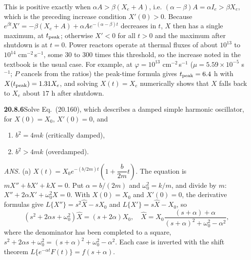 This is positive exactly when $\alpha A>\beta(X_e+A)$, i.e.
$(\alpha-\beta)A=\alpha I_e>\beta X_e$, which is the
preceding increase condition $X'(0)>0$. Because
$e^{\beta t}X'=-\beta(X_e+A)+\alpha Ae^{-(\alpha-\beta)t}$
decreases in $t$, $X$ then has a single maximum, at
$t_{\rm peak}$; otherwise $X'<0$ for all $t>0$ and the maximum
after shutdown is at $t=0$.
Power reactors operate at thermal fluxes of about $10^{13}$ to
$10^{14}$ cm$^{-2}$\,s$^{-1}$, some $30$ to $300$ times this
threshold, so the increase noted in the textbook is the usual
case. For example, at $\varphi=10^{13}$ cm$^{-2}$\,s$^{-1}$
($\mu=5.59\times10^{-5}$ s$^{-1}$; $P$ cancels from the ratios)
the peak-time formula gives $t_{\rm peak}=6.4$ h with
$X(t_{\rm peak})=1.31X_e$, and solving $X(t)=X_e$ numerically
shows that $X$ falls back to $X_e$ about $17$ h after shutdown.

\par\bigskip
\noindent\textbf{20.8.6}\quad Solve Eq.~(20.160), which describes
a damped simple harmonic oscillator, for $X(0)=X_{0}$,
$X'(0)=0$, and
\begin{enumerate}
\item[(a)] $b^{2}=4mk$ (critically damped),
\item[(b)] $b^{2}>4mk$ (overdamped).
\end{enumerate}
\par\nobreak\hfill\emph{ANS.}\enspace
(a) $X(t)=X_{0}e^{-(b/2m)t}\left(1+\dfrac{b}{2m}t\right)$.
\solution
The equation is $mX''+bX'+kX=0$. Put
$\alpha=b/(2m)$ and $\omega_0^2=k/m$, and divide by $m$:
$X''+2\alpha X'+\omega_0^2X=0$. With $X(0)=X_0$ and $X'(0)=0$,
the derivative formulas give $L\{X''\}=s^2\widehat X-sX_0$
and $L\{X'\}=s\widehat X-X_0$, so
\[
(s^2+2\alpha s+\omega_0^2)\widehat X=(s+2\alpha)X_0,
\quad
\widehat X=X_0\frac{(s+\alpha)+\alpha}
{(s+\alpha)^2+\omega_0^2-\alpha^2},
\]
where the denominator has been completed to a square,
$s^2+2\alpha s+\omega_0^2=(s+\alpha)^2+\omega_0^2-\alpha^2$.
Each case is inverted with the shift theorem
$L\{e^{-\alpha t}F(t)\}=f(s+\alpha)$.

